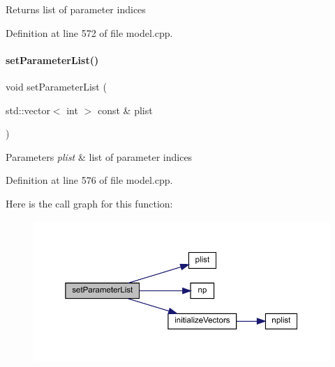\begin{DoxyReturn}{Returns}
list of parameter indices 
\end{DoxyReturn}


Definition at line 572 of file model.\+cpp.

\mbox{\label{classamici_1_1_model_a2afe974183e4bccaf746f6409941fe8f}} 
\paragraph{\texorpdfstring{set\+Parameter\+List()}{setParameterList()}}
{\footnotesize\ttfamily void set\+Parameter\+List (\begin{DoxyParamCaption}\item[{std\+::vector$<$ int $>$ const \&}]{plist }\end{DoxyParamCaption})}


\begin{DoxyParams}{Parameters}
{\em plist} & list of parameter indices \\
\hline
\end{DoxyParams}


Definition at line 576 of file model.\+cpp.

Here is the call graph for this function\+:
\nopagebreak
\begin{figure}[H]
\begin{center}
\leavevmode
\includegraphics[width=350pt]{classamici_1_1_model_a2afe974183e4bccaf746f6409941fe8f_cgraph}
\end{center}
\end{figure}
\mbox{\label{classamici_1_1_model_a34b007de55db268995bdc788accdc57d}} 
